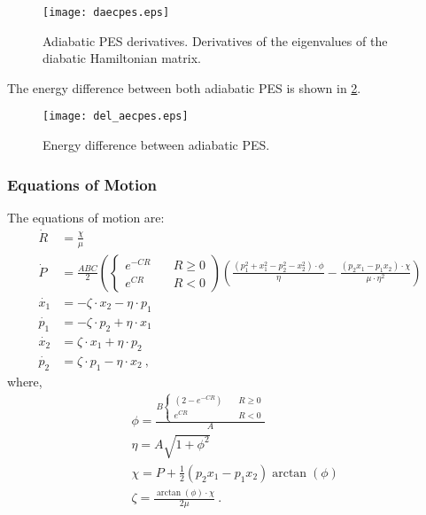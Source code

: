 \begin{figure}
\centering
\texttt{[image: daecpes.eps]}
\caption[Extended coupling: adiabatic PES derivatives.]{Adiabatic PES derivatives. Derivatives of the eigenvalues of the diabatic Hamiltonian matrix.}
\label{f:dapesec}
\end{figure}

The energy difference between both adiabatic PES is shown in \cref{f:delapesec}.

\begin{figure}
\centering
\texttt{[image: del\_aecpes.eps]}
\caption[Extended coupling: energy difference between adiabatic PES]{Energy difference between adiabatic PES.}
\label{f:delapesec}
\end{figure}
%
\subsubsection{Equations of Motion}
%
The equations of motion are:
\begin{subequations}
\begin{align}
\dot{R} & = \frac{\chi}{\mu} \\
\dot{P} & = \frac{A B C}{2} \left(
\begin{cases}
e^{-C R} &\quad R\geq 0\\
e^{C R} &\quad R<0
\end{cases}
\right)
\left(\frac{(p_{1}^{2} + x_{1}^{2} - p_{2}^{2} - x_{2}^{2})\cdot \phi}{\eta} -\frac{(p_{2} x_{1} - p_{1} x_{2})\cdot \chi}{\mu \cdot \eta^{2}}
\right)\\
\dot{x_{1}} & = -\zeta\cdot x_{2} - \eta\cdot p_{1} \\
\dot{p_{1}} & = -\zeta\cdot p_{2} + \eta\cdot x_{1} \\
\dot{x_{2}} & = \zeta\cdot x_{1} + \eta\cdot p_{2} \\
\dot{p_{2}} & = \zeta\cdot p_{1} - \eta\cdot x_{2}~,
\end{align}
\end{subequations}
where,
\begin{subequations}
\begin{align}
&\phi = \frac{
B\begin{cases}
(2 - e^{-C R}) &\quad R \geq 0\\
e^{C R} &\quad R < 0
\end{cases}}{A} \\
&\eta = A\sqrt{1 + \phi^{2}}\\
&\chi = P + \frac{1}{2}(p_{2} x_{1} - p_{1} x_{2}) \arctan(\phi)\\
&\zeta =\frac{\arctan(\phi)\cdot \chi}{2 \mu}~.
\end{align}
\end{subequations}
%
